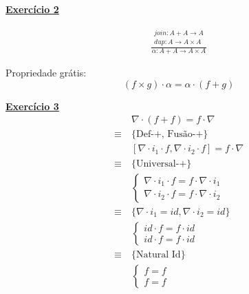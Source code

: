 \documentclass[a4paper,11pt]{article}
\begin{document}
	\noindent \underline{\textbf{Exercício 2}}
	
	\begin{minipage}{0.25\textwidth}
		\[
		\begin{aligned}
			\frac{
				\begin{array}{c}
					join : A + A \rightarrow A \\
					dup : A \rightarrow A \times A
				\end{array}
			}
			{
				\alpha : A + A \rightarrow A \times A
			}
		\end{aligned}
		\]
	\end{minipage}
	\hfill
	\begin{minipage}{0.9\textwidth}
			\begin{figure}[H]
			\centering
		\end{figure}
	\end{minipage}
	
	\noindent Propriedade grátis:
	\[
	(f \times g) \cdot \alpha = \alpha \cdot (f + g)
	\]
	
	\newpage
	
	\noindent \underline{\textbf{Exercício 3}}
	\[
	\begin{aligned}
		& \nabla \cdot (f + f) = f \cdot \nabla \\
		\equiv \  &\{\text{Def-+, Fusão-+}\}\\
		&[\nabla \cdot i_1 \cdot f, \nabla \cdot i_2 \cdot f] = f \cdot \nabla \\
		\equiv \  &\{\text{Universal-+}\}\\
		&\begin{cases}
			\nabla \cdot i_1 \cdot f = f \cdot \nabla \cdot i_1 \\
			\nabla \cdot i_2 \cdot f = f \cdot \nabla \cdot i_2
		\end{cases}\\
		\equiv \  &\{\nabla \cdot i_1 = id, \nabla \cdot i_2 = id \}\\
		&\begin{cases}
			id \cdot f = f \cdot id \\
			id \cdot f = f \cdot id
		\end{cases}\\
		\equiv \  &\{\text{Natural Id}\}\\
		&\begin{cases}
			f = f \\
			f = f
		\end{cases}
	\end{aligned}
	\]
	
\end{document}
